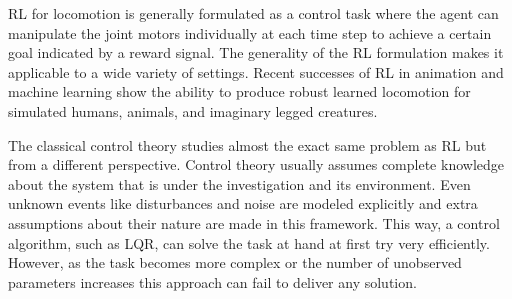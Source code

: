 %

\ac{RL} for locomotion is generally formulated as a control task where the agent can manipulate the joint motors individually at each time step to achieve a certain goal indicated by a reward signal. The generality of the \ac{RL} formulation makes it applicable to a wide variety of settings. Recent successes of \ac{RL} in animation and machine learning show the ability to produce robust learned locomotion for simulated humans, animals, and imaginary legged creatures.







The classical control theory studies almost the exact same problem as \ac{RL} but from a different perspective. Control theory usually assumes complete knowledge about the system that is under the investigation and its environment.
Even unknown events like disturbances and noise are modeled explicitly and extra assumptions about their nature are made in this framework. This way, a control algorithm, such as LQR, can solve the task at hand at first try very efficiently.
However, as the task becomes more complex or the number of unobserved parameters increases this approach can fail to deliver any solution.

